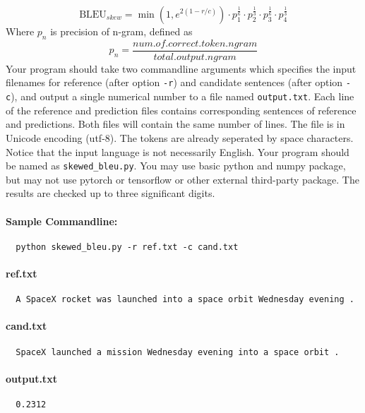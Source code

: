 \documentclass[12pt,letterpaper]{article}
\begin{document}
\[\mathrm{BLEU}_{skew} = \min(1, e^{2(1-r/c)}) \cdot p_1^\frac{1}{6} \cdot p_2^\frac{1}{3} \cdot p_3^\frac{1}{6} \cdot p_4^\frac{1}{3}\]
Where $p_n$ is precision of n-gram, defined as 
\[p_n=\frac{num.of.correct.token.ngram}{total.output.ngram}
    \]
Your program should take two commandline arguments which specifies the input filenames for reference (after option \texttt{-r}) and candidate sentences (after option \texttt{-c}), and output a single numerical number to a file named \texttt{output.txt}.
Each line of the reference and prediction files contains corresponding sentences of reference and predictions. 
Both files will contain the same number of  lines.
The file is in Unicode encoding (utf-8). The tokens are already seperated by space characters. Notice that the input language is not necessarily English.
Your program should be named as \texttt{skewed\_bleu.py}.
You may use basic python and numpy package, but may not use pytorch or tensorflow or other external third-party package.
The results are checked up to three significant digits. 

\paragraph{Sample Commandline:}
\begin{verbatim}
  python skewed_bleu.py -r ref.txt -c cand.txt
\end{verbatim}

\paragraph{ref.txt}
\begin{verbatim}
  A SpaceX rocket was launched into a space orbit Wednesday evening .
\end{verbatim}

\paragraph{cand.txt}
\begin{verbatim}
  SpaceX launched a mission Wednesday evening into a space orbit .
\end{verbatim}

\paragraph{output.txt}
\begin{verbatim}
  0.2312
\end{verbatim}
\end{document}
